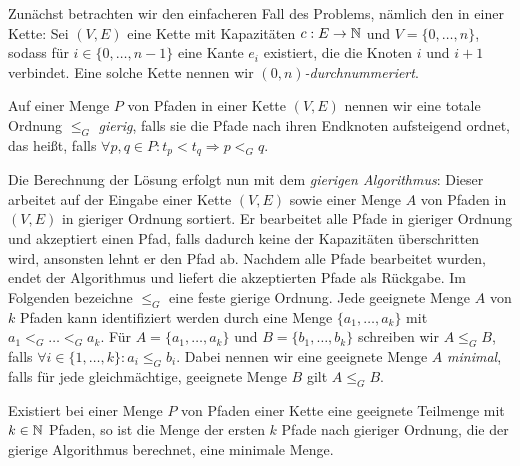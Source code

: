 Zunächst betrachten wir den einfacheren Fall des Problems, nämlich den in einer Kette:
Sei $(V,E)$ eine Kette mit Kapazitäten $c: E \to \mathbb N$ und $V=\{0,\dots,n\}$, sodass für $i \in \{0,\dots,n-1\}$
eine Kante $e_i$ existiert, die die Knoten $i$ und $i+1$ verbindet.
Eine solche Kette nennen wir  {\em $(0, n)$-durchnummeriert}.
\begin{definition}
    Auf einer Menge $P$ von Pfaden in einer Kette $(V,E)$ nennen wir eine totale Ordnung $\leq_G$ {\em gierig},
    falls sie die Pfade nach ihren Endknoten aufsteigend ordnet, das heißt, falls
    $\forall p, q \in P \colon t_p < t_q \Rightarrow p <_G q$.
\end{definition}
Die Berechnung der Lösung erfolgt nun mit dem {\em gierigen Algorithmus}: Dieser arbeitet auf der Eingabe einer
Kette $(V,E)$ sowie einer Menge $A$ von Pfaden in $(V,E)$ in gieriger Ordnung sortiert. 
Er bearbeitet alle Pfade in gieriger Ordnung und akzeptiert einen Pfad, falls dadurch keine der Kapazitäten
überschritten wird, ansonsten lehnt er den Pfad ab.
Nachdem alle Pfade bearbeitet wurden, endet der Algorithmus und liefert die akzeptierten Pfade als Rückgabe.
Im Folgenden bezeichne $\leq_G$ eine feste gierige Ordnung.
Jede geeignete Menge $A$ von $k$ Pfaden kann identifiziert werden durch eine Menge $\{a_1, \dots, a_k\}$ mit
$a_1 <_G \dots <_G a_k$.
Für $A=\{a_1,\dots,a_k\}$ und $B=\{b_1,\dots,b_k\}$ schreiben wir $A \leq_G B$, falls $\forall i \in \{1,\dots,k\}\colon a_i \leq_G b_i$.
Dabei nennen wir eine geeignete Menge $A$ {\em minimal}, falls für jede gleichmächtige, geeignete Menge $B$
gilt $A \leq_G B$.
\begin{lemma}
    \label{greedyAlgorithm}
    Existiert bei einer Menge $P$ von Pfaden einer Kette eine geeignete Teilmenge mit $k \in \mathbb N$ Pfaden, so ist die
    Menge der ersten $k$ Pfade nach gieriger Ordnung, die der gierige Algorithmus berechnet, eine minimale Menge.
\end{lemma}

